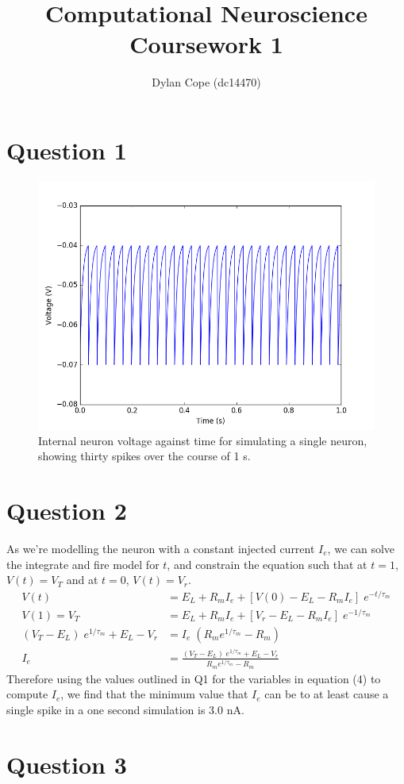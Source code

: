 \documentclass[12pt, a4paper]{article}
\title{Computational Neuroscience Coursework 1}
\author{Dylan Cope (dc14470)}
\date{}
\begin{document}
\nocite{*}


\maketitle

\section*{Question 1}

\begin{figure}[H]
  \centering
  \includegraphics[width=0.5\linewidth]{figures/q1}
  \caption{Internal neuron voltage against time for simulating a single neuron, showing thirty spikes over the course of 1 s.}
\end{figure}

\section*{Question 2}

As we're modelling the neuron with a constant injected current $I_e$, we can solve the integrate and fire model for $t$, and constrain the equation such that at $t=1$, $V(t)=V_T$ and at $t=0$, $V(t) = V_r$.
\begin{align}
  V(t) &= E_L + R_m I_e + [V(0) - E_L - R_m I_e]\; e^{-t/\tau_m}\\
  V(1) = V_T &= E_L + R_m I_e + [V_r - E_L - R_m I_e]\; e^{-1/\tau_m}\\
  (V_T - E_L)\; e^{1/\tau_m} + E_L - V_r &= I_e\; (R_m e^{1/\tau_m} - R_m)\\
  I_e &= \frac{(V_T - E_L)\; e^{1/\tau_m} + E_L - V_r}{R_m e^{1/\tau_m} - R_m}
\end{align}
Therefore using the values outlined in Q1 for the variables in equation (4) to compute $I_e$, we find that the minimum value that $I_e$ can be to at least cause a single spike in a one second simulation is 3.0 nA.

\section*{Question 3}
\end{document}
